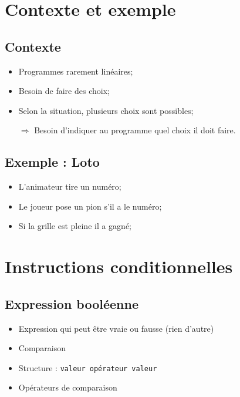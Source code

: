 \documentclass[12pt,a4paper]{article}
\date{}
\begin{document}


\section{Contexte et exemple}

	\subsection{Contexte}
	
	\begin{itemize}
		\item Programmes rarement linéaires;
		\item Besoin de faire des choix;
		\item Selon la situation, plusieurs choix sont possibles;
		\item[$\Rightarrow$] Besoin d'indiquer au programme quel choix il doit faire.
	\end{itemize}
	
	
	\subsection{Exemple : Loto}
	
	\begin{itemize}
		\item L'animateur tire un numéro;
		\item Le joueur pose un pion s'il a le numéro;
		\item Si la grille est pleine il a gagné;
\end{itemize}

\section{Instructions conditionnelles}

	\subsection{Expression booléenne}
		\begin{itemize}
			\item Expression qui peut être vraie ou fausse (rien d'autre)
			\item Comparaison 
			\item Structure : \texttt{valeur opérateur valeur}
			\item Opérateurs de comparaison
		\end{itemize}
	
\end{document}
